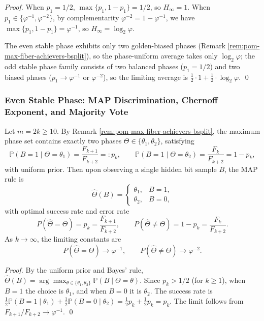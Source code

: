 \begin{proof}
When \(p_1=1/2\), \(\max\{p_1,1-p_1\}=1/2\), so \(H_\infty=1\).
When \(p_1\in\{\varphi^{-1},\varphi^{-2}\}\), by complementarity \(\varphi^{-2}=1-\varphi^{-1}\), we have
\(\max\{p_1,1-p_1\}=\varphi^{-1}\), so \(H_\infty=\log_2\varphi\).
\par
The even stable phase exhibits only two golden-biased phases (Remark \ref{rem:pom-max-fiber-achievers-bsplit}), so the phase-uniform average takes only \(\log_2\varphi\);
the odd stable phase family consists of two balanced phases (\(p_1=1/2\)) and two biased phases (\(p_1\to\varphi^{-1}\) or \(\varphi^{-2}\)), so the limiting average is \(\frac12\cdot 1+\frac12\cdot\log_2\varphi\). \qed
\end{proof}

\subsubsection{Even Stable Phase: MAP Discrimination, Chernoff Exponent, and Majority Vote}

\begin{proposition}\label{prop:pom-max-fiber-even-single-sample-map}
Let \(m=2k\ge 10\).
By Remark \ref{rem:pom-max-fiber-achievers-bsplit}, the maximum phase set contains exactly two phases \(\Theta\in\{\theta_1,\theta_2\}\), satisfying
\[
\mathbb{P}(B=1\mid \Theta=\theta_1)=\frac{F_{k+1}}{F_{k+2}}=:p_k,\qquad
\mathbb{P}(B=1\mid \Theta=\theta_2)=\frac{F_{k}}{F_{k+2}}=1-p_k,
\]
with uniform prior.
Then upon observing a single hidden bit sample \(B\), the MAP rule is
\[
\widehat\Theta(B)=
\begin{cases}
\theta_1,& B=1,\\
\theta_2,& B=0,
\end{cases}
\]
with optimal success rate and error rate
\[
P(\widehat\Theta=\Theta)=p_k=\frac{F_{k+1}}{F_{k+2}},\qquad
P(\widehat\Theta\neq\Theta)=1-p_k=\frac{F_{k}}{F_{k+2}}.
\]
As \(k\to\infty\), the limiting constants are
\[
P(\widehat\Theta=\Theta)\to \varphi^{-1},\qquad
P(\widehat\Theta\neq\Theta)\to \varphi^{-2}.
\]
\end{proposition}

\begin{proof}
By the uniform prior and Bayes' rule,
\(
\widehat\Theta(B)=\arg\max_{\theta\in\{\theta_1,\theta_2\}}\mathbb{P}(B\mid\Theta=\theta)
\).
Since \(p_k>1/2\) (for \(k\ge 1\)), when \(B=1\) the choice is \(\theta_1\), and when \(B=0\) it is \(\theta_2\).
The success rate is
\(
\frac12\mathbb{P}(B=1\mid\theta_1)+\frac12\mathbb{P}(B=0\mid\theta_2)=\frac12 p_k+\frac12 p_k=p_k
\).
The limit follows from \(F_{k+1}/F_{k+2}\to \varphi^{-1}\). \qed
\end{proof}

